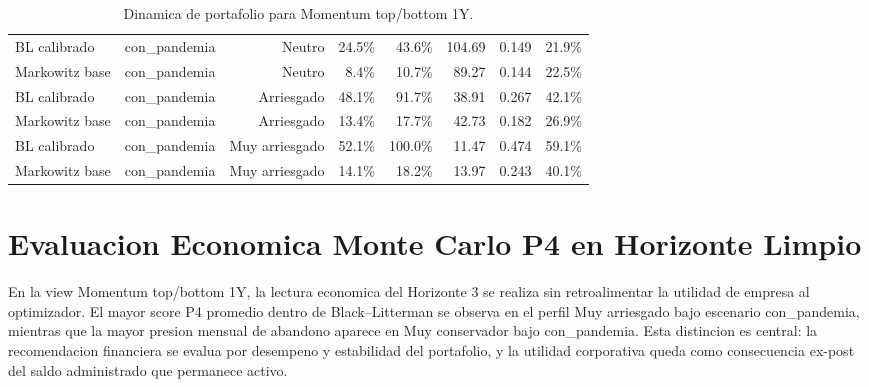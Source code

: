 \documentclass[11pt]{article}
\begin{document}
\begin{table}[H]
{\begin{tabular}{lrrrrrrr}
BL calibrado & con\_pandemia & Neutro & 24.5\% & 43.6\% & 104.69 & 0.149 & 21.9\% \\
Markowitz base & con\_pandemia & Neutro & 8.4\% & 10.7\% & 89.27 & 0.144 & 22.5\% \\
BL calibrado & con\_pandemia & Arriesgado & 48.1\% & 91.7\% & 38.91 & 0.267 & 42.1\% \\
Markowitz base & con\_pandemia & Arriesgado & 13.4\% & 17.7\% & 42.73 & 0.182 & 26.9\% \\
BL calibrado & con\_pandemia & Muy arriesgado & 52.1\% & 100.0\% & 11.47 & 0.474 & 59.1\% \\
Markowitz base & con\_pandemia & Muy arriesgado & 14.1\% & 18.2\% & 13.97 & 0.243 & 40.1\% \\
\bottomrule
\end{tabular}
}
\caption{Dinamica de portafolio para Momentum top/bottom 1Y.}
\label{tab:dinamica_momentum_top_bottom_1y_v1_plus}
\end{table}


\section{Evaluacion Economica Monte Carlo P4 en Horizonte Limpio}

En la view Momentum top/bottom 1Y, la lectura economica del Horizonte 3 se realiza sin retroalimentar la utilidad de empresa al optimizador. El mayor score P4 promedio dentro de Black--Litterman se observa en el perfil Muy arriesgado bajo escenario con\_pandemia, mientras que la mayor presion mensual de abandono aparece en Muy conservador bajo con\_pandemia. Esta distincion es central: la recomendacion financiera se evalua por desempeno y estabilidad del portafolio, y la utilidad corporativa queda como consecuencia ex-post del saldo administrado que permanece activo.
\end{document}
